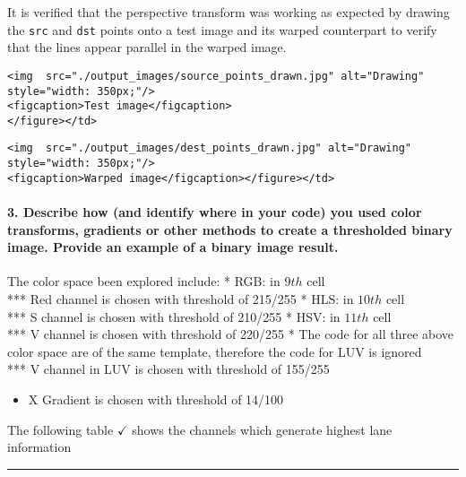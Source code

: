 \documentclass[11pt]{article}
\providecommand{\tightlist}{%
      \setlength{\itemsep}{0pt}\setlength{\parskip}{0pt}}
\begin{document}
It is verified that the perspective transform was working as expected by
drawing the \texttt{src} and \texttt{dst} points onto a test image and
its warped counterpart to verify that the lines appear parallel in the
warped image.

\begin{verbatim}
<img  src="./output_images/source_points_drawn.jpg" alt="Drawing" style="width: 350px;"/>
<figcaption>Test image</figcaption>
</figure></td>
\end{verbatim}

\begin{verbatim}
<img  src="./output_images/dest_points_drawn.jpg" alt="Drawing" style="width: 350px;"/>
<figcaption>Warped image</figcaption></figure></td>
\end{verbatim}

\paragraph{3. Describe how (and identify where in your code) you used
color transforms, gradients or other methods to create a thresholded
binary image. Provide an example of a binary image
result.}\label{describe-how-and-identify-where-in-your-code-you-used-color-transforms-gradients-or-other-methods-to-create-a-thresholded-binary-image.-provide-an-example-of-a-binary-image-result.}

The color space been explored include: * RGB: in \(9th\) cell\\
*** Red channel is chosen with threshold of 215/255 * HLS: in \(10th\)
cell\\
*** S channel is chosen with threshold of 210/255 * HSV: in \(11th\)
cell\\
*** V channel is chosen with threshold of 220/255 * The code for all
three above color space are of the same template, therefore the code for
LUV is ignored\\
*** V channel in LUV is chosen with threshold of 155/255

\begin{itemize}
\tightlist
\item
  X Gradient is chosen with threshold of 14/100
\end{itemize}

The following table \textbf{\(\checkmark\)} shows the channels which
generate highest lane information

\begin{center}\rule{0.5\linewidth}{\linethickness}\end{center}
\end{document}
